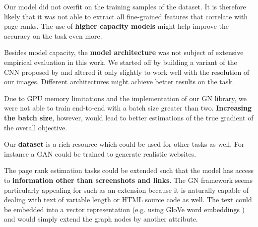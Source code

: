 Our model did not overfit on the training samples of the dataset. It is therefore likely that it was not able to extract all fine-grained features that correlate with page ranks. The use of \textbf{higher capacity models} might help improve the accuracy on the task even more.

Besides model capacity, the \textbf{model architecture} was not subject of extensive empirical evaluation in this work. We started off by building a variant of the CNN proposed by \cite{beltramelli:pix2code} and altered it only slightly to work well with the resolution of our images. Different architectures might achieve better results on the task.

Due to GPU memory limitations and the implementation of our GN library, we were not able to train end-to-end with a batch size greater than two. \textbf{Increasing the batch size}, however, would lead to better estimations of the true gradient of the overall objective.

Our \textbf{dataset} is a rich resource which could be used for other tasks as well. For instance a GAN \cite{goodfellow2014generative} could be trained to generate realistic websites.

The page rank estimation tasks could be extended such that the model has access to \textbf{information other than screenshots and links}. The GN framework seems particularly appealing for such as an extension because it is naturally capable of dealing with text of variable length or HTML source code as well. The text could be embedded into a vector representation (e.g. using GloVe word embeddings \cite{pennington2014:glove}) and would simply extend the graph nodes by another attribute.
